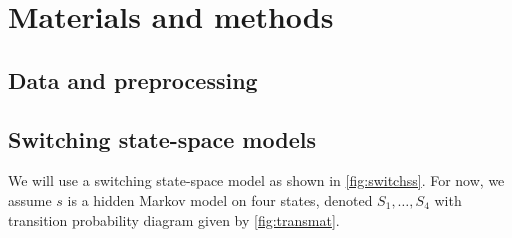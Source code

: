 \documentclass[12pt]{article}
\begin{document}
\section{Materials and methods}

\subsection{Data and preprocessing}

\subsection{Switching state-space models}

We will use a switching state-space model as shown in
\autoref{fig:switchss}. For now, we assume $s$ is a hidden Markov model on
four states, denoted $S_1,\ldots,S_4$ with transition probability
diagram given by \autoref{fig:transmat}.
\end{document}
